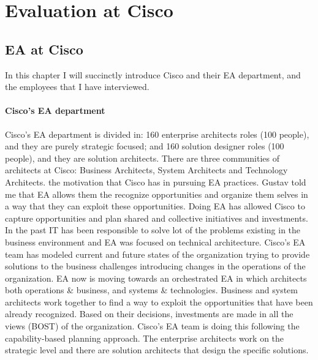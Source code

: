 
\chapter{Evaluation at Cisco} %

\label{Chapter5} %



\section{EA at Cisco}

In this chapter I will succinctly introduce Cisco and their EA department, and the employees that I have interviewed.


\subsubsection*{Cisco's EA department}
Cisco's EA department is divided in: 160 enterprise architects roles (100 people), and they are purely strategic focused; and 160 solution designer roles (100 people), and they are solution architects.
There are three communities of architects at Cisco: Business Architects, System Architects and Technology Architects.
 the motivation that Cisco has in pursuing EA practices. Gustav told me that EA allows them the recognize opportunities and organize them selves in a way that they can exploit these opportunities.
Doing EA has allowed Cisco to capture opportunities and plan shared and collective initiatives and investments.
In the past IT has been responsible to solve lot of the problems existing in the business environment and EA was focused on technical architecture. Cisco's EA team has modeled current and future states of the organization trying to provide solutions to the business challenges introducing changes in the operations of the organization.
EA now is moving towards an orchestrated EA in which architects both operations & business, and systems & technologies. Business and system architects work together to find a way to exploit the opportunities that have been already recognized.
Based on their decisions, investments are made in all the views (BOST) of the organization.
Cisco's EA team is doing this following the capability-based planning approach. The enterprise architects work on the strategic level and there are solution architects that design the specific solutions.

